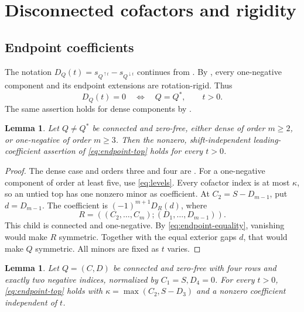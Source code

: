 \documentclass[11pt,a4paper]{amsart}
\numberwithin{equation}{section}
\theoremstyle{plain}
\newtheorem{lemma}[theorem]{Lemma}
\theoremstyle{definition}
\begin{document}
\section{Disconnected cofactors and rigidity}\label{sec:component-reductions}

\subsection{Endpoint coefficients}

The notation \(D_Q(t)=s_{Q^{\uparrow t}}-s_{Q^{\downarrow t}}\) continues
from .  By , every
one-negative component and its endpoint extensions are rotation-rigid.
Thus
\begin{equation}\label{eq:endpoint-equality}
 D_Q(t)=0\quad\Longleftrightarrow\quad Q=Q^*,\qquad t>0.
\end{equation}
The same assertion holds for dense components by .

\begin{lemma}\label{lem:one-negative-endpoint}
Let \(Q\ne Q^*\) be connected and zero-free, either dense of order
\(m\ge2\), or one-negative of order \(m\ge3\).  Then the nonzero,
shift-independent leading-coefficient assertion of \eqref{eq:endpoint-top}
holds for every \(t>0\).
\end{lemma}

\begin{proof}
The dense case and orders three and four are .
For a one-negative component of order at least five, use \eqref{eq:levels}.
Every cofactor index is at most \(\kappa\), so an untied top has one
nonzero minor as coefficient.  At \(C_2=S-D_{m-1}\), put
\(d=D_{m-1}\).  The coefficient is \((-1)^{m+1}D_R(d)\), where
\[
 R=((C_2,\ldots,C_m);(D_1,\ldots,D_{m-1})).
\]
This child is connected and one-negative.  By
\eqref{eq:endpoint-equality}, vanishing would make \(R\) symmetric.
Together with the equal exterior gaps \(d\), that would make \(Q\)
symmetric.  All minors are fixed as \(t\) varies.
\end{proof}

\begin{lemma}\label{lem:two-negative-endpoint}
Let \(Q=(C,D)\) be connected and zero-free with four rows and exactly
two negative indices, normalized by \(C_1=S,D_4=0\).  For every \(t>0\),
\eqref{eq:endpoint-top} holds with
\(\kappa=\max(C_2,S-D_3)\) and a nonzero coefficient independent of \(t\).
\end{lemma}
\end{document}
